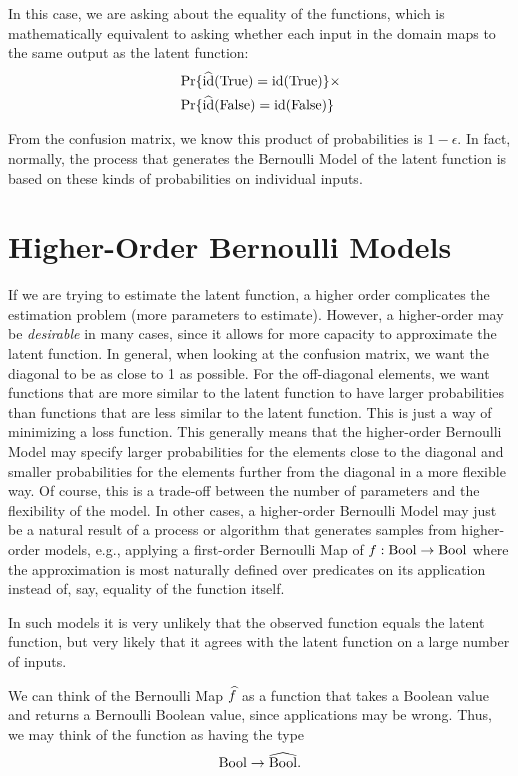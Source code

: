 \documentclass[../main.tex]{subfiles}
\begin{document}
In this case, we are asking about the equality of the functions, which is mathematically equivalent to asking whether each input in the domain maps to the same output as the latent function:
\begin{align}
&\Pr\{\widehat{\mathrm{id}}(\mathrm{True}) = \mathrm{id}(\mathrm{True}) \} \times \nonumber\\
&\Pr\{\widehat{\mathrm{id}}(\mathrm{False}) = \mathrm{id}(\mathrm{False}) \}
\end{align}

From the confusion matrix, we know this product of probabilities is $1-\epsilon$. In fact, normally, the process that generates the Bernoulli Model of the latent function is based on these kinds of probabilities on individual inputs.

\section{Higher-Order Bernoulli Models}

If we are trying to estimate the latent function, a higher order complicates the estimation problem (more parameters to estimate). However, a higher-order may be \emph{desirable} in many cases, since it allows for more capacity to approximate the latent function. In general, when looking at the confusion matrix, we want the diagonal to be as close to 1 as possible. For the off-diagonal elements, we want functions that are more similar to the latent function to have larger probabilities than functions that are less similar to the latent function. This is just a way of minimizing a loss function.
This generally means that the higher-order Bernoulli Model may specify larger probabilities for the elements close to the diagonal and smaller probabilities for the elements further from the diagonal in a more flexible way. Of course, this is a trade-off between the number of parameters and the flexibility of the model. In other cases, a higher-order Bernoulli Model may just be a natural result of a process or algorithm that generates samples from higher-order models, e.g., applying a first-order Bernoulli Map of $f : \mathrm{Bool} \to \mathrm{Bool}$ where the approximation is most naturally defined over predicates on its application instead of, say, equality of the function itself.

In such models it is very unlikely that the observed function equals the latent function, but very likely that it agrees with the latent function on a large number of inputs.

We can think of the Bernoulli Map $\widehat{f}$ as a function that takes a Boolean value and returns a Bernoulli Boolean value, since applications may be wrong. Thus, we may think of the function as having the type
$$
    \mathrm{Bool} \to \widehat{\mathrm{Bool}}.
$$
\end{document}
